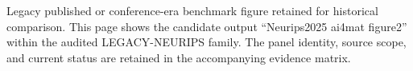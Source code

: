 Legacy published or conference-era benchmark figure retained for historical comparison. This page shows the candidate output ``Neurips2025 ai4mat figure2'' within the audited LEGACY-NEURIPS family. The panel identity, source scope, and current status are retained in the accompanying evidence matrix.
